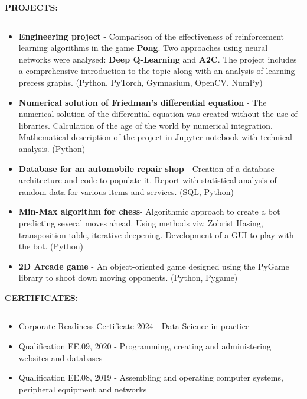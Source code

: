 \documentclass[10pt]{article}
\newcommand{\longline}{\rule{19.6cm}{1pt}}
\begin{document}
\noindent \fontsize{14pt}{14pt}\selectfont \textbf{\color{Violet}PROJECTS:}
\fontsize{10pt}{10pt}\selectfont
\\
\noindent \longline 
\begin{itemize}[leftmargin=*]
    \item \textbf{Engineering project} - Comparison of the effectiveness of reinforcement learning algorithms in the game \textbf{Pong}. 
    Two approaches using neural networks were analysed: \textbf{Deep Q-Learning} and \textbf{A2C}.
    The project includes a comprehensive introduction to the topic along with an analysis of learning precess graphs. (Python, PyTorch, Gymnasium, OpenCV, NumPy)
    \item \textbf{Numerical solution of Friedman's differential equation} - The numerical solution of the differential equation
    was created without the use of libraries. Calculation of the age of the world by numerical integration. Mathematical description of the
    project in Jupyter notebook with technical analysis. (Python)
    \item \textbf{Database for an automobile repair shop} - Creation of a database architecture and code to populate it.
    Report with statistical analysis of random data for various items and services. (SQL, Python)
    \item \textbf{Min-Max algorithm for chess}- Algorithmic approach to create a bot predicting several moves ahead.
    Using methods viz: Zobrist Hasing, transposition table, iterative deepening. Development of a GUI to play with the bot. (Python)
    \item \textbf{2D Arcade game} - An object-oriented game designed using the PyGame library to shoot down moving opponents. (Python, Pygame)
\end{itemize}

\noindent \fontsize{14pt}{14pt}\selectfont \textbf{\color{Violet}CERTIFICATES:}
\fontsize{10pt}{10pt}\selectfont 
\\ 
\noindent \longline 
\begin{itemize}[leftmargin=*]
    \item Corporate Readiness Certificate 2024 - Data Science in practice
    \item Qualification EE.09, 2020 - Programming, creating and administering websites and databases
    \item Qualification EE.08, 2019 - Assembling and operating computer systems, peripheral equipment and networks
\end{itemize}
\end{document}
